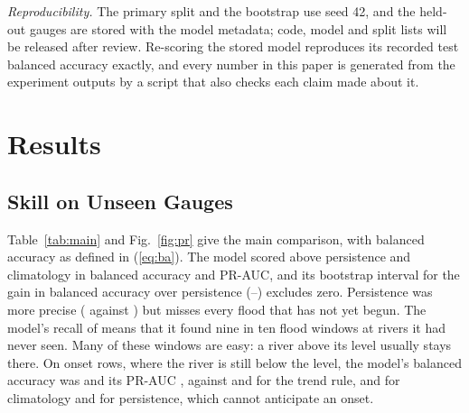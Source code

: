 \documentclass[conference]{IEEEtran}
\begin{document}
\textit{Reproducibility.} The primary split and the bootstrap use seed 42, and the \NUnseenGauges{} held-out gauges are stored with the model metadata; code, model and split lists will be released after review. Re-scoring the stored model reproduces its recorded test balanced accuracy exactly, and every number in this paper is generated from the experiment outputs by a script that also checks each claim made about it.

\section{Results}
\subsection{Skill on Unseen Gauges}
Table~\ref{tab:main} and Fig.~\ref{fig:pr} give the main comparison, with balanced accuracy as defined in (\ref{eq:ba}). The model scored above persistence and climatology in balanced accuracy and PR-AUC, and its bootstrap interval for the gain in balanced accuracy over persistence (\DiffPersLo--\DiffPersHi) excludes zero. Persistence was more precise (\PersPrec{} against \XgbPrec) but misses every flood that has not yet begun. The model's recall of \XgbRec{} means that it found nine in ten flood windows at rivers it had never seen. Many of these windows are easy: a river above its level usually stays there. On onset rows, where the river is still below the level, the model's balanced accuracy was \OnXgbBA{} and its PR-AUC \OnXgbPR, against \OnTrendBA{} and \OnTrendPR{} for the trend rule, \OnClimBA{} and \OnClimPR{} for climatology and \OnPersBA{} for persistence, which cannot anticipate an onset.
\end{document}
